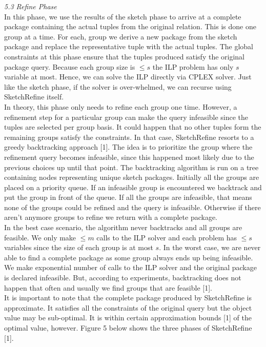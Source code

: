 \documentclass[a4paper,12pt]{article}
\begin{document}
\textit{5.3 Refine Phase}
\\

In this phase, we use the results of the sketch phase to arrive at a complete package containing the actual tuples from the original relation. This is done one group at a time. For each, group we derive a new package from the sketch package and replace the representative tuple with the actual tuples. The global constraints at this phase ensure that the tuples produced satisfy the original package query. Because each group size is $\leq s$ the ILP problem has only $s$ variable at most. Hence, we can solve the ILP directly via CPLEX solver. Just like the sketch phase, if the solver is over-whelmed, we can recurse using SketchRefine itself. 
\\

In theory, this phase only needs to refine each group one time. However, a refinement step for a particular group can make the query infeasible since the tuples are selected per group basis. It could happen that no other tuples form the remaining groups satisfy the constraints. In that case, SketchRefine resorts to a greedy backtracking approach [1]. The idea is to prioritize the group where the refinement query becomes infeasible, since this happened most likely due to the previous choices up until that point. The backtracking algorithm is run on a tree containing nodes representing unique sketch packages. Initially all the groups are placed on a priority queue. If an infeasible group is encountered we backtrack and put the group in front of the queue. If all the groups are infeasible, that means none of the groups could be refined and the query is infeasible. Otherwise if there aren't anymore groups to refine we return with a complete package.
\\

In the best case scenario, the algorithm never backtracks and all groups are feasible. We only make $\leq m$ calls to the ILP solver and each problem has $\leq s$ variables since the size of each group is at most $s$. In the worst case, we are never able to find a complete package as some group always ends up being infeasible. We make exponential number of calls to the ILP solver and the original package is declared infeasible. But, according to experiments, backtracking does not happen that often and usually we find groups that are feasible [1].
\\

It is important to note that the complete package produced by SketchRefine is approximate. It satisfies all the constraints of the original query but the object value may be sub-optimal. It is within certain approximation bounds [1] of the optimal value, however. Figure 5 below shows the three phases of SketchRefine [1]. 
\end{document}
